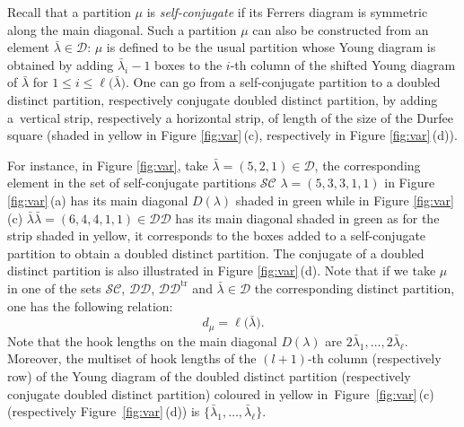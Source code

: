 \documentclass[pdftex]{sigma}
\numberwithin{equation}{section}
\def\ccsc{\mathcal {SC}}
\def\ccdd{\mathcal {DD}}
\def\ccd{\mathcal {D}}
\begin{document}
  Recall that a partition $\mu$ is \textit{self-conjugate} if its Ferrers diagram is symmetric along the main diagonal. Such a partition $\mu$ can also be constructed from an element $\bar{\lambda}\in\ccd$: $\mu$ is defined to be the usual partition whose Young diagram is obtained by adding $\bar{\lambda}_i-1$ boxes to the $i$-th column of the shifted Young diagram of $\bar{\lambda}$ for $1\leq i\leq \ell\bigl(\bar{\lambda}\bigr)$. One can go from a self-conjugate partition to a doubled distinct partition, respectively conjugate doubled distinct partition, by adding a~vertical strip, respectively a horizontal strip, of length of the size of the Durfee square (shaded in yellow in Figure \ref{fig:var}\,(c), respectively in Figure \ref{fig:var}\,(d)).

   For instance, in Figure \ref{fig:var}, take $\bar{\lambda}=(5,2,1)\in \ccd$, the corresponding element in the set of self-conjugate partitions $\ccsc$ $\lambda=(5,3,3,1,1)$ in Figure \ref{fig:var}\,(a) has its main diagonal $D(\lambda)$ shaded in green while in Figure \ref{fig:var}\,(c) $\bar{\lambda}\bar{\lambda}=(6,4,4,1,1)\in\ccdd$ has its main diagonal shaded in green as for the strip shaded in yellow, it corresponds to the boxes added to a self-conjugate partition to obtain a doubled distinct partition. The conjugate of a doubled distinct partition is also illustrated in Figure \ref{fig:var}\,(d). Note that if we take $\mu$ in one of the sets $\ccsc$, $\ccdd$, $\ccdd^{\mathrm{tr}}$ and $\bar{\lambda}\in\ccd$ the corresponding distinct partition, one has the following relation:
\begin{equation*}%
 d_\mu=\ell\bigl(\bar{\lambda}\bigr).
 \end{equation*}
Note that the hook lengths on the main diagonal $D(\lambda)$ are $ 2 \bar{\lambda}_1,\dots,2\bar{\lambda}_\ell$. Moreover, the multiset of hook lengths of the $(l+1)$-th column (respectively row) of the Young diagram of the doubled distinct partition (respectively conjugate doubled distinct partition) coloured in yellow in~Figure~\ref{fig:var}\,(c) (respectively Figure~\ref{fig:var}\,(d)) is $\bigl\lbrace \bar{\lambda}_1,\dots,\bar{\lambda}_\ell\bigr\rbrace$.
\end{document}
